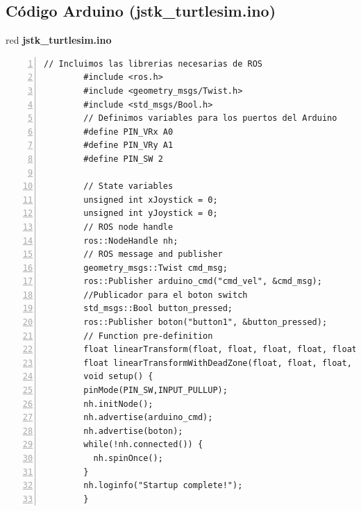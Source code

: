 \documentclass{article}
\begin{document}
\subsection{Código Arduino (\textbf{jstk\_turtlesim.ino})}{\label{sec:codigo_arduino}}


\begin{bodyblock}{red}{ \textbf{jstk\_turtlesim.ino}}

  \begin{lstlisting}[language=Arduino, mathescape=true, breaklines=true,numbers=left,
    xleftmargin=0.03\textwidth, columns=fullflexible, flexiblecolumns=true, gobble=8]
        // Incluimos las librerias necesarias de ROS
        #include <ros.h>
        #include <geometry_msgs/Twist.h>
        #include <std_msgs/Bool.h>
        // Definimos variables para los puertos del Arduino
        #define PIN_VRx A0
        #define PIN_VRy A1
        #define PIN_SW 2

        // State variables
        unsigned int xJoystick = 0;
        unsigned int yJoystick = 0;
        // ROS node handle
        ros::NodeHandle nh;
        // ROS message and publisher
        geometry_msgs::Twist cmd_msg;
        ros::Publisher arduino_cmd("cmd_vel", &cmd_msg);
        //Publicador para el boton switch
        std_msgs::Bool button_pressed;
        ros::Publisher boton("button1", &button_pressed);
        // Function pre-definition
        float linearTransform(float, float, float, float, float);
        float linearTransformWithDeadZone(float, float, float, float, float, float, float);
        void setup() {
        pinMode(PIN_SW,INPUT_PULLUP);
        nh.initNode();
        nh.advertise(arduino_cmd);
        nh.advertise(boton);
        while(!nh.connected()) {
          nh.spinOnce();
        }
        nh.loginfo("Startup complete!");
        }
\end{lstlisting}
\end{bodyblock}
\end{document}

